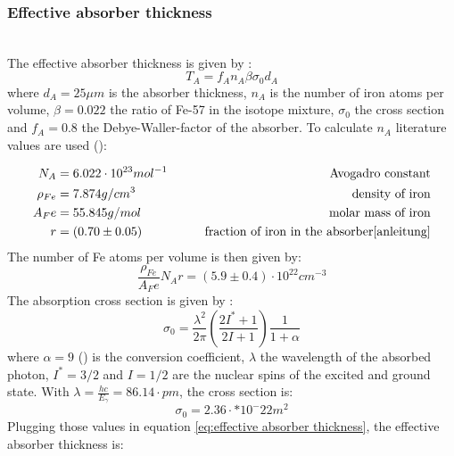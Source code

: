 \subsubsection{Effective absorber thickness} \ \\
The effective absorber thickness is given by \cite{anleitung}:
\begin{equation}
T_A = f_An_A\beta\sigma_0d_A
\label{eq:effective absorber thickness}
\end{equation}
where $d_A = 25\mu m$ is the absorber thickness, $n_A$ is the number of iron atoms per volume, $\beta=0.022$ the ratio of Fe-57 in the isotope mixture, $\sigma_0$ the cross section and $f_A=0.8$ the Debye-Waller-factor of the absorber.
To calculate $n_A$ literature values are used (\cite{webelements}):

\begin{equation*}
\begin{aligned}
N_A &= 6.022 \cdot 10^{23} mol^{-1} \qquad& \text{Avogadro constant}\\
\rho_{Fe} &= 7.874 g/cm^3 \qquad& \text{density of iron} \\
A_Fe &= 55.845 g/mol \qquad& \text{molar mass of iron}\\
r &=  (0.70\pm0.05) \qquad& \text{fraction of iron in the absorber\cite{anleitung}}
\end{aligned}
\end{equation*}
The number of Fe atoms per volume is then given by:
\begin{equation*}
\frac{\rho_{Fe}}{A_Fe}N_Ar= (5.9\pm0.4)\cdot 10^{22} cm^{-3}
\end{equation*}
The absorption cross section is given by \cite{Wegener}:
\begin{equation}
\sigma_0= \frac{\lambda^2}{2\pi} \left(\frac{2I^*+1}{2I+1}\right) \frac{1}{1+\alpha}
\end{equation}
where $\alpha =9$ (\cite{Wegener}) is the conversion coefficient, $\lambda$ the wavelength of the absorbed photon, $I^*=3/2$ and $I=1/2$  are the nuclear spins of the excited and ground state. With $\lambda = \frac{hc}{E_\gamma}=86.14\cdot pm$, the cross section is:
\begin{equation}
\sigma_0=2.36\cdot*10^-22m^2
\end{equation}
Plugging those values in equation \ref{eq:effective absorber thickness}, the effective absorber thickness is:

